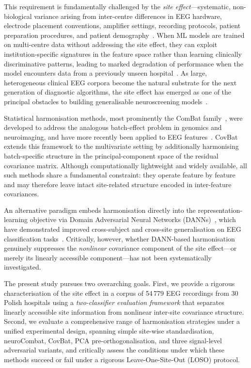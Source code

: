 \documentclass[preprint,12pt]{elsarticle}
\begin{document}
This requirement is fundamentally challenged by the \emph{site
effect}---systematic, non-biological variance arising from
inter-centre differences in EEG hardware, electrode placement
conventions, amplifier settings, recording protocols, patient
preparation procedures, and patient
demography~\cite{jaramillo2024combat,li2022harmnqeeg}.
When ML models are trained on multi-centre data without addressing
the site effect, they can exploit institution-specific signatures in
the feature space rather than learning clinically discriminative
patterns, leading to marked degradation of performance when the model
encounters data from a previously unseen
hospital~\cite{kiessner2023extended,mellot2023meeg}.
As large, heterogeneous clinical EEG corpora become the natural
substrate for the next generation of diagnostic algorithms, the site
effect has emerged as one of the principal obstacles to building
generalisable neuroscreening models~\cite{dong2025normative,
mushtaq2025eeg}.

Statistical harmonisation methods, most prominently the ComBat
family~\cite{johnson2007adjusting,fortin2017harmonization,
fortin2018cortical}, were developed to address the analogous
batch-effect problem in genomics and neuroimaging, and have more
recently been applied to EEG
features~\cite{jaramillo2024combat,li2022harmnqeeg}.
CovBat~\cite{hu2023image} extends this framework to the multivariate
setting by additionally harmonising batch-specific structure in the
principal-component space of the residual covariance matrix.
Although computationally lightweight and widely available, all such
methods share a fundamental constraint: they operate feature by feature
and may therefore leave intact site-related structure encoded in
inter-feature covariances.

An alternative paradigm embeds harmonisation directly into the
representation-learning objective via Domain Adversarial Neural
Networks (DANNs)~\cite{ganin2016domain}, which have demonstrated
improved cross-subject and cross-site generalisation on EEG
classification tasks~\cite{bethge2022multidomain,liu2023multisource,
ozdenizci2020invariant}.
Critically, however, whether DANN-based harmonisation genuinely
suppresses the \emph{nonlinear} covariance component of the site
effect---or merely its linearly accessible component---has not been
systematically investigated.

The present study pursues two overarching goals.
First, we provide a rigorous characterisation of the site effect in a
corpus of 54\,779 EEG recordings from 30 Polish hospitals using a
\emph{two-classifier evaluation framework} that separates linearly
accessible site information from nonlinear inter-site covariance
structure.
Second, we evaluate a comprehensive range of harmonisation strategies
under a unified experimental design, spanning simple site-wise
standardisation, neuroCombat, CovBat, PCA pre-orthogonalisation, and
three signal-level adversarial variants, and critically assess the
conditions under which these methods succeed or fail under a rigorous
Leave-One-Site-Out (LOSO) protocol.
\end{document}
